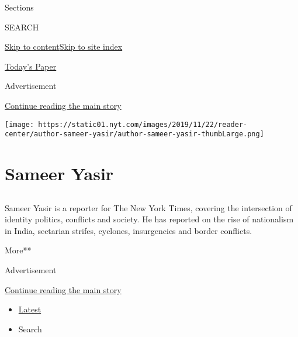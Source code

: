 Sections

SEARCH

\protect\hyperlink{site-content}{Skip to
content}\protect\hyperlink{site-index}{Skip to site index}

\href{https://myaccount.nytimes.com/auth/login?response_type=cookie\&client_id=vi}{}

\href{https://www.nytimes.com/section/todayspaper}{Today's Paper}

Advertisement

\protect\hyperlink{after-top}{Continue reading the main story}

\texttt{[image: https://static01.nyt.com/images/2019/11/22/reader-center/author-sameer-yasir/author-sameer-yasir-thumbLarge.png]}

\hypertarget{sameer-yasir}{%
\section{Sameer Yasir}\label{sameer-yasir}}

\subsection{}

Sameer Yasir is a reporter for The New York Times, covering the
intersection of identity politics, conflicts and society. He has
reported on the rise of nationalism in India, sectarian strifes,
cyclones, insurgencies and border conflicts.

More**

Advertisement

\protect\hyperlink{after-mid1}{Continue reading the main story}

\begin{itemize}
\tightlist
\item
  \protect\hyperlink{stream-panel}{Latest}
\item
  Search
\end{itemize}

